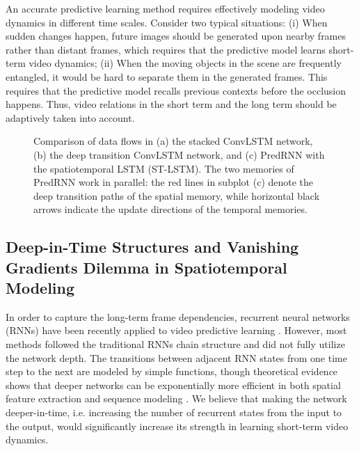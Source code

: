 \documentclass{article}
\begin{document}
An accurate predictive learning method requires effectively modeling video dynamics in different time scales. Consider two typical situations: (i) When sudden changes happen, future images should be generated upon nearby frames rather than distant frames, which requires that the predictive model learns short-term video dynamics; (ii) When the moving objects in the scene are frequently entangled, it would be hard to separate them in the generated frames. This requires that the predictive model recalls previous contexts before the occlusion happens. Thus, video relations in the short term and the long term should be adaptively taken into account.





\begin{figure*}[h]
\vskip 0.05in
\centering
{}
\caption{Comparison of data flows in (a) the stacked ConvLSTM network, (b) the deep transition ConvLSTM network, and (c) PredRNN with the spatiotemporal LSTM (ST-LSTM). The two memories of PredRNN work in parallel: the red lines in subplot (c) denote the deep transition paths of the spatial memory, while horizontal black arrows indicate the update directions of the temporal memories.}
\label{fig:model_comparison}
\end{figure*}


\subsection{Deep-in-Time Structures and Vanishing Gradients Dilemma in Spatiotemporal Modeling}

In order to capture the long-term frame dependencies, recurrent neural networks (RNNs) \cite{rumelhart1988learning,werbos1990backpropagation,williams1995gradient} have been recently applied to video predictive learning \cite{Ranzato2014Video}. However, most methods \cite{srivastava2015unsupervised,shi2015convolutional,patraucean2015spatio} followed the traditional RNNs chain structure and did not fully utilize the network depth. The transitions between adjacent RNN states from one time step to the next are modeled by simple functions, though theoretical evidence shows that deeper networks can be exponentially more efficient in both spatial feature extraction \cite{bianchini2014complexity} and sequence modeling \cite{Gustavsson2012On}. We believe that making the network deeper-in-time, i.e. increasing the number of recurrent states from the input to the output, would significantly increase its strength in learning short-term video dynamics.
\end{document}
